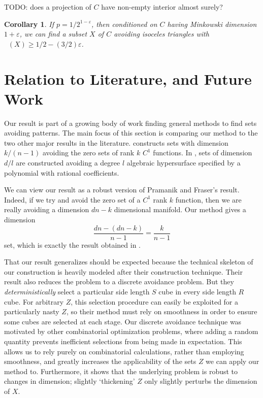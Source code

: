 \documentclass[dvipsnames,letterpaper,12pt]{article}
\numberwithin{equation}{section}
\theoremstyle{plain}
\newtheorem{corollary}{Corollary}
\theoremstyle{remark}
\DeclareMathOperator{\hausdim}{\dim_{\mathbf{H}}}
\begin{document}
TODO: does a projection of $C$ have non-empty interior almost surely?

\begin{corollary}
	If $p = 1/2^{1 - \varepsilon}$, then conditioned on $C$ having Minkowski dimension $1 + \varepsilon$, we can find a subset $X$ of $C$ avoiding isoceles triangles with $\hausdim(X) \geq 1/2 - (3/2) \varepsilon$.
\end{corollary}










\section{Relation to Literature, and Future Work}\label{futureWorkSection}

Our result is part of a growing body of work finding general methods to find sets avoiding patterns. The main focus of this section is comparing our method to the two other major results in the literature. \cite{MalabikaRob} constructs sets with dimension $k/(n-1)$ avoiding the zero sets of rank $k$ $C^1$ functions. In \cite{Mathe}, sets of dimension $d/l$ are constructed avoiding a degree $l$ algebraic hypersurface specified by a polynomial with rational coefficients.

We can view our result as a robust version of Pramanik and Fraser's result. Indeed, if we try and avoid the zero set of a $C^1$ rank $k$ function, then we are really avoiding a dimension $dn - k$ dimensional manifold. Our method gives a dimension
%
\[ \frac{dn - (dn - k)}{n - 1} = \frac{k}{n - 1} \]
%
set, which is exactly the result obtained in \cite{MalabikaRob}.

That our result generalizes \cite{MalabikaRob} should be expected because the technical skeleton of our construction is heavily modeled after their construction technique. Their result also reduces the problem to a discrete avoidance problem. But they {\it deterministically} select a particular side length $S$ cube in every side length $R$ cube. For arbitrary $Z$, this selection procedure can easily be exploited for a particularly nasty $Z$, so their method must rely on smoothness in order to ensure some cubes are selected at each stage. Our discrete avoidance technique was motivated by other combinatorial optimization problems, where adding a random quantity prevents inefficient selections from being made in expectation. This allows us to rely purely on combinatorial calculations, rather than employing smoothness, and greatly increases the applicability of the sets $Z$ we can apply our method to. Furthermore, it shows that the underlying problem is robust to changes in dimension; slightly `thickening' $Z$ only slightly perturbs the dimension of $X$.
\end{document}
